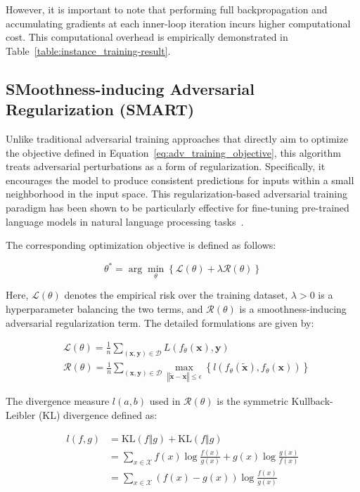 \documentclass[10pt,twocolumn,letterpaper]{article}
\begin{document}
However, it is important to note that performing full backpropagation and accumulating gradients at each inner-loop iteration incurs higher computational cost. This computational overhead is empirically demonstrated in Table~\ref{table:instance_training-result}.

\subsection{SMoothness-inducing Adversarial Regularization (SMART)}

Unlike traditional adversarial training approaches that directly aim to optimize the objective defined in Equation~\ref{eq:adv_training_objective}, this algorithm treats adversarial perturbations as a form of regularization. Specifically, it encourages the model to produce consistent predictions for inputs within a small neighborhood in the input space. This regularization-based adversarial training paradigm has been shown to be particularly effective for fine-tuning pre-trained language models in natural language processing tasks~\cite{Jiang_2020}.

The corresponding optimization objective is defined as follows:

\begin{equation}
\theta^* = \arg\min_\theta\left\{\mathcal{L}(\theta) + \lambda \mathcal{R}(\theta)\right\}
\tag{2:4:1}
\label{formula:adversarial_target2}
\end{equation}

Here, $\mathcal{L}(\theta)$ denotes the empirical risk over the training dataset, $\lambda > 0$ is a hyperparameter balancing the two terms, and $\mathcal{R}(\theta)$ is a smoothness-inducing adversarial regularization term. The detailed formulations are given by:

$$
\begin{aligned}
  &\mathcal{L}(\theta)=\frac{1}{n}\sum_{(\mathbf{x}, \mathbf{y})\in\mathcal{D}} L(f_\theta(\mathbf{x}), \mathbf{y}) \\
  &\mathcal{R}(\theta)=\frac{1}{n}\sum_{(\mathbf{x}, \mathbf{y})\in\mathcal{D}} \max_{\left\Vert \tilde{\mathbf{x}}-\mathbf{x}\right\Vert\leq \epsilon}\left\{l\left(f_\theta(\tilde{\mathbf{x}}), f_\theta(\mathbf{x})\right)\right\}
\end{aligned}
$$

The divergence measure $l(a, b)$ used in $\mathcal{R}(\theta)$ is the symmetric Kullback-Leibler (KL) divergence defined as:

$$
\begin{aligned}
l(f, g)&=\mathrm{KL}(f\Vert g) + \mathrm{KL}(f\Vert g) \\
&=\sum_{x\in \mathcal{X}} f(x)\log\frac{f(x)}{g(x)} + g(x)\log\frac{g(x)}{f(x)} \\
&=\sum_{x\in \mathcal{X}} (f(x) - g(x))\log\frac{f(x)}{g(x)}
\end{aligned}
$$
\end{document}
